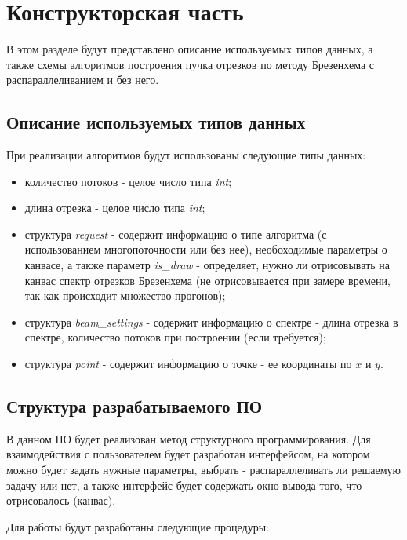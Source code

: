\chapter{Конструкторская часть}
В этом разделе будут представлено описание используемых типов данных, а также схемы алгоритмов построения пучка отрезков по методу Брезенхема с распараллеливанием и без него.

\section{Описание используемых типов данных}

При реализации алгоритмов будут использованы следующие типы данных:

\begin{itemize}
	\item количество потоков - целое число типа \textit{int};
	\item длина отрезка - целое число типа \textit{int};
	\item структура \textit{request} - содержит информацию о типе алгоритма (с использованием многопоточности или без нее), необоходимые параметры о канвасе, а также параметр \textit{is\_draw} - определяет, нужно ли отрисовывать на канвас спектр отрезков Брезенхема (не отрисовывается при замере времени, так как происходит множество прогонов);
	\item структура \textit{beam\_settings} - содержит информацию о спектре - длина отрезка в спектре, количество потоков при построении (если требуется);
	\item структура \textit{point} - содержит информацию о точке - ее координаты по $x$ и $y$.
\end{itemize}


\section{Структура разрабатываемого ПО}

В данном ПО будет реализован метод структурного программирования. Для взаимодействия с пользователем будет разработан интерфейсом, на котором можно будет задать нужные параметры, выбрать - распараллеливать ли решаемую задачу или нет, а также интерфейс будет содержать окно вывода того, что отрисовалось (канвас). 

Для работы будут разработаны следующие процедуры:

